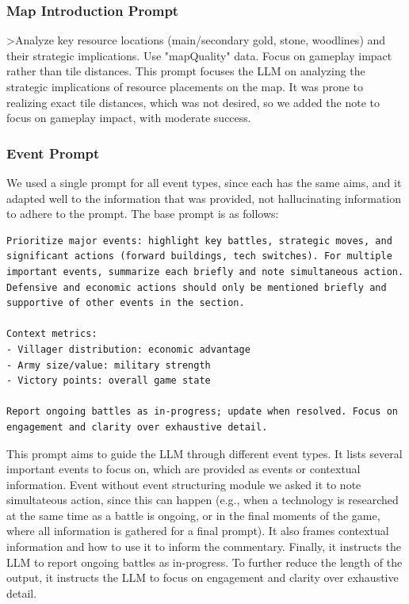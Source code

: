 \subsubsection*{Map Introduction Prompt}
>Analyze key resource locations (main/secondary gold, stone, woodlines) and their strategic implications. Use "mapQuality" data. Focus on gameplay impact rather than tile distances.
This prompt focuses the LLM on analyzing the strategic implications of resource placements on the map. It was prone to realizing exact tile distances, which was not desired, so we added the note to focus on gameplay impact, with moderate success.

\subsubsection*{Event Prompt}
We used a single prompt for all event types, since each has the same aims, and it adapted well to the information that was provided, not hallucinating information to adhere to the prompt. The base prompt is as follows:
\begin{verbatim}
Prioritize major events: highlight key battles, strategic moves, and
significant actions (forward buildings, tech switches). For multiple
important events, summarize each briefly and note simultaneous action.
Defensive and economic actions should only be mentioned briefly and
supportive of other events in the section.

Context metrics:
- Villager distribution: economic advantage
- Army size/value: military strength
- Victory points: overall game state

Report ongoing battles as in-progress; update when resolved. Focus on
engagement and clarity over exhaustive detail.
\end{verbatim}

This prompt aims to guide the LLM through different event types. It lists several important events to focus on, which are provided as events or contextual information. Event without event structuring module we asked it to note simultateous action, since this can happen (e.g., when a technology is researched at the same time as a battle is ongoing, or in the final moments of the game, where all information is gathered for a final prompt). It also frames contextual information and how to use it to inform the commentary. Finally, it instructs the LLM to report ongoing battles as in-progress. To further reduce the length of the output, it instructs the LLM to focus on engagement and clarity over exhaustive detail.

